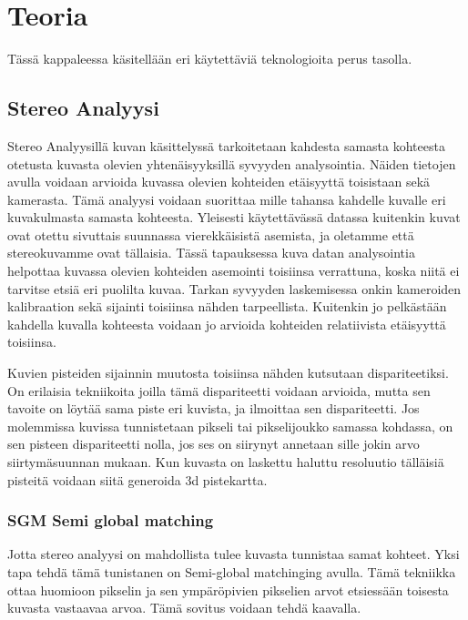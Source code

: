 \chapter{Teoria}%
\label{ch:teoria}

Tässä kappaleessa käsitellään eri käytettäviä teknologioita perus tasolla.

\section{Stereo Analyysi}

Stereo Analyysillä kuvan käsittelyssä tarkoitetaan kahdesta samasta kohteesta otetusta kuvasta olevien yhtenäisyyksillä syvyyden analysointia. Näiden tietojen avulla voidaan arvioida kuvassa olevien kohteiden etäisyyttä toisistaan sekä kamerasta. Tämä analyysi voidaan suorittaa mille tahansa kahdelle kuvalle eri kuvakulmasta samasta kohteesta. Yleisesti käytettävässä datassa kuitenkin kuvat ovat otettu sivuttais suunnassa vierekkäisistä asemista, ja oletamme että stereokuvamme ovat tällaisia. Tässä tapauksessa kuva datan analysointia helpottaa kuvassa olevien kohteiden asemointi toisiinsa verrattuna, koska niitä ei tarvitse etsiä eri puolilta kuvaa. Tarkan syvyyden laskemisessa onkin kameroiden kalibraation sekä sijainti toisiinsa nähden tarpeellista. Kuitenkin jo pelkästään kahdella kuvalla kohteesta voidaan jo arvioida kohteiden relatiivista etäisyyttä toisiinsa. 

Kuvien pisteiden sijainnin muutosta toisiinsa nähden kutsutaan dispariteetiksi. On erilaisia tekniikoita joilla tämä dispariteetti voidaan arvioida, mutta sen tavoite on löytää sama piste eri kuvista, ja ilmoittaa sen dispariteetti. Jos molemmissa kuvissa tunnistetaan pikseli tai pikselijoukko samassa kohdassa, on sen pisteen dispariteetti nolla, jos ses on siirynyt annetaan sille jokin arvo siirtymäsuunnan mukaan. Kun kuvasta on laskettu haluttu resoluutio tälläisiä pisteitä voidaan siitä generoida 3d pistekartta.

\subsection{SGM Semi global matching}

Jotta stereo analyysi on mahdollista tulee kuvasta tunnistaa samat kohteet. Yksi tapa tehdä tämä tunistanen on Semi-global matchinging avulla\cite{hirschmuller2005babel}. Tämä tekniikka ottaa huomioon pikselin ja sen ympäröpivien pikselien arvot etsiessään toisesta kuvasta vastaavaa arvoa. Tämä sovitus voidaan tehdä kaavalla.

